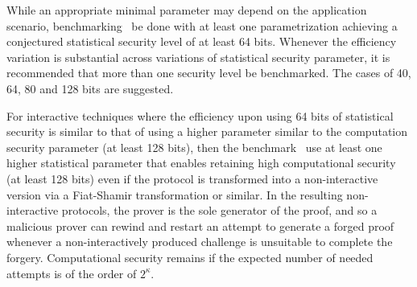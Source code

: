 	While an appropriate minimal parameter may depend on the application scenario, benchmarking \shall\ be done with at least one parametrization achieving a conjectured statistical security level of at least 64 bits.
	Whenever the efficiency variation is substantial across variations of statistical security parameter, it is recommended that more than one security level be benchmarked. 
    The cases of 40, 64, 80 and 128 bits are suggested.

	For interactive techniques where the efficiency upon using 64 bits of statistical security is similar to that of using a higher parameter similar to the computation security parameter (at least 128 bits), then the benchmark \should\ use at least one higher statistical parameter that enables retaining high computational security (at least 128 bits) even if the protocol is transformed into a non-interactive version via a Fiat-Shamir transformation or similar.
	In the resulting non-interactive protocols, the prover is the sole generator of the proof, and so a malicious prover can rewind and restart an attempt to generate a forged proof
whenever a non-interactively produced challenge is unsuitable to complete the forgery.
	Computational security remains if the expected number of needed attempts is of the order of $2^{\kappa}$.
	\loosen
